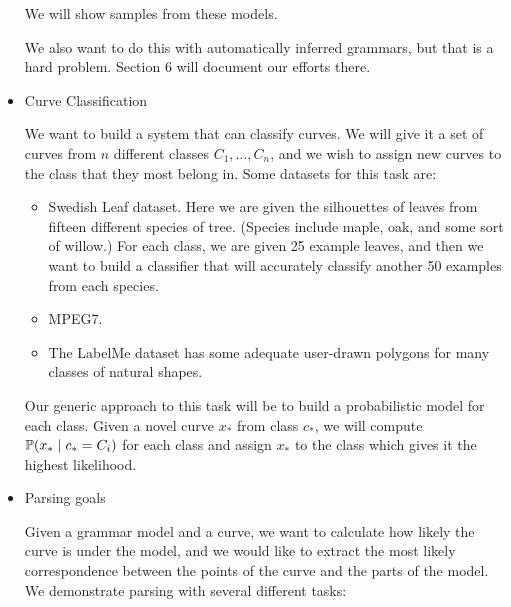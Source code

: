 \begin{itemize}
We will show samples from these models.

We also want to do this with automatically inferred grammars, but that
is a hard problem. Section 6 will document our efforts there.

\item Curve Classification

We want to build a system that can classify curves. We will give it a
set of curves from $n$ different classes $C_1,\dots,C_n$, and we wish
to assign new curves to the class that they most belong in. Some
datasets for this task are:
\begin{itemize}
\item Swedish Leaf dataset. Here we are given the silhouettes of
  leaves from fifteen different species of tree. (Species include
  maple, oak, and some sort of willow.) For each class, we are given
  25 example leaves, and then we want to build a classifier that will
  accurately classify another 50 examples from each species.

\item MPEG7.

\item The LabelMe dataset \cite{labelme} has some adequate user-drawn
  polygons for many classes of natural shapes.

\end{itemize}

Our generic approach to this task will be to build a probabilistic
model for each class. Given a novel curve $x_*$ from class $c_*$, we
will compute $\mathbb{P}( x_* \mid c_* = C_i)$ for each class and assign
$x_*$ to the class which gives it the highest likelihood.

\item Parsing goals

Given a grammar model and a curve, we want to calculate how likely the
curve is under the model, and we would like to extract the most likely
correspondence between the points of the curve and the parts of the
model. We demonstrate parsing with several different tasks:


\end{itemize}
